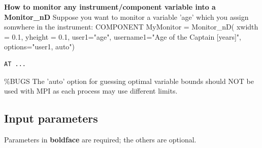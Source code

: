 \textbf{How to monitor any instrument/component variable into a Monitor\_nD} Suppose you want to monitor a variable 'age' which you assign somwhere in the instrument: COMPONENT MyMonitor = Monitor\_nD( xwidth = 0.1, yheight = 0.1, user1="age", username1="Age of the Captain [years]", options="user1, auto")

\begin{verbatim}
AT ...
\end{verbatim}

\%BUGS The 'auto' option for guessing optimal variable bounds should NOT be used with MPI as each process may use different limits.

\subsection*{Input parameters}
Parameters in \textbf{boldface} are required; the others are optional.

